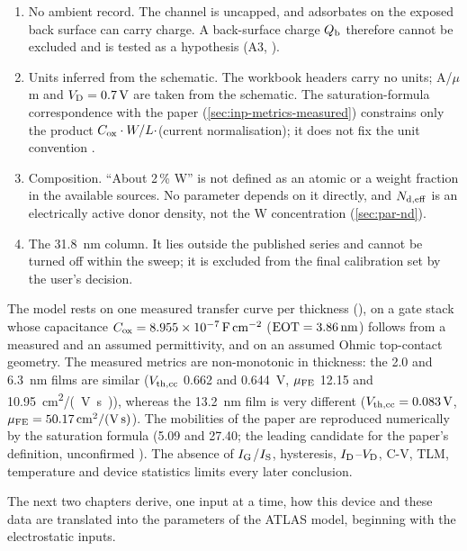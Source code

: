 \begin{enumerate}
        A thickness error of the order of a nanometre at \SI{6.3}{nm} is therefore an open hypothesis (tested as A1,
        , in \cref{ch:6p3}).
  \item No ambient record. The channel is uncapped, and adsorbates on the exposed back surface can carry charge. A
        back-surface charge $Q_{\mathrm{b}}$ therefore cannot be excluded and is tested as a hypothesis (A3, ).
  \item Units inferred from the schematic. The workbook headers carry no units; A/$\mu$m and $V_{\mathrm{D}} = \SI{0.7}{V}$ are
        taken from the schematic. The saturation-formula correspondence with the paper
        (\cref{sec:inp-metrics-measured}) constrains only the product $C_{\mathrm{ox}}\cdot W/L\cdot$(current normalisation);
        it does not fix the unit convention  .
  \item Composition. ``About 2\,\% W'' is not defined as an atomic or a weight fraction in the available sources. No
        parameter depends on it directly, and $N_{\mathrm{d,eff}}$ is an electrically active donor density, not the W
        concentration (\cref{sec:par-nd}).
  \item The \SI{31.8}{nm} column. It lies outside the published series and cannot be turned off within the sweep; it is
        excluded from the final calibration set by the user's decision.
\end{enumerate}

\begin{keyresult}
The model rests on one measured transfer curve per thickness (\evDATA), on a gate stack whose capacitance
$C_{\mathrm{ox}} = \SI{8.955e-7}{\farad\per\centi\metre\squared}$ ($\mathrm{EOT} = \SI{3.86}{nm}$) follows from a measured \HfO{} and an
assumed \AlO{} permittivity, and on an assumed Ohmic top-contact geometry. The measured metrics are non-monotonic in
thickness: the 2.0 and \SI{6.3}{nm} films are similar ($V_{\mathrm{th,cc}}$ 0.662 and \SI{0.644}{V}, $\mu_{\mathrm{FE}}$ 12.15 and
\SI{10.95}{cm^2/(V.s)}), whereas the \SI{13.2}{nm} film is very different ($V_{\mathrm{th,cc}} = \SI{0.083}{V}$,
$\mu_{\mathrm{FE}} = \SI{50.17}{cm^2/(V.s)}$). The mobilities of the paper are reproduced numerically by the saturation formula (5.09 and 27.40;
the leading candidate for the paper's definition, unconfirmed ). The absence of $I_{\mathrm{G}}$/$I_{\mathrm{S}}$, hysteresis, $I_{\mathrm{D}}$--$V_{\mathrm{D}}$, C-V, TLM, temperature and device statistics limits
every later conclusion.
\end{keyresult}

The next two chapters derive, one input at a time, how this device and these data are translated into the parameters of
the ATLAS model, beginning with the electrostatic inputs.

